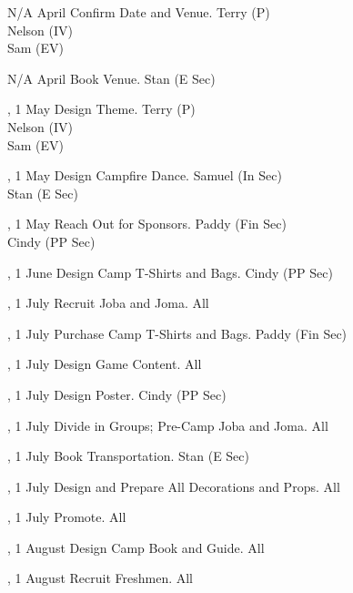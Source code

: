 \eTABLEhead
\bTABLEbody

\bTR\bTD N/A
\eTD{} April
\eTD\bTD Confirm Date and Venue.
\eTD\bTD Terry (P) \\ Nelson (IV) \\ Sam (EV)
\eTD\eTR

\bTR\bTD N/A
\eTD{} April
\eTD\bTD Book Venue.
\eTD\bTD Stan (E Sec)
\eTD\eTR

\bTR{}, 1
\eTD{} May
\eTD\bTD Design Theme.
\eTD\bTD Terry (P) \\ Nelson (IV) \\ Sam (EV)
\eTD\eTR

\bTR{}, 1
\eTD{} May
\eTD\bTD Design Campfire Dance.
\eTD\bTD Samuel (In Sec) \\ Stan (E Sec)
\eTD\eTR

\bTR{}, 1
\eTD{} May
\eTD\bTD Reach Out for Sponsors.
\eTD\bTD Paddy (Fin Sec) \\ Cindy (PP Sec)
\eTD\eTR

\bTR{}, 1
\eTD{} June
\eTD\bTD Design Camp T-Shirts and Bags.
\eTD\bTD Cindy (PP Sec)
\eTD\eTR

\bTR{}, 1
\eTD{} July
\eTD\bTD Recruit Joba and Joma.
\eTD\bTD All
\eTD\eTR

\bTR{}, 1
\eTD{} July
\eTD\bTD Purchase Camp T-Shirts and Bags.
\eTD\bTD Paddy (Fin Sec)
\eTD\eTR

\bTR{}, 1
\eTD{} July
\eTD\bTD Design Game Content.
\eTD\bTD All
\eTD\eTR

\bTR{}, 1
\eTD{} July
\eTD\bTD Design Poster.
\eTD\bTD Cindy (PP Sec)
\eTD\eTR

\bTR{}, 1
\eTD{} July
\eTD\bTD Divide in Groups; Pre-Camp Joba and Joma.
\eTD\bTD All
\eTD\eTR

\bTR{}, 1
\eTD{} July
\eTD\bTD Book Transportation.
\eTD\bTD Stan (E Sec)
\eTD\eTR

\bTR{}, 1
\eTD{} July
\eTD\bTD Design and Prepare All Decorations and Props.
\eTD\bTD All
\eTD\eTR

\bTR{}, 1
\eTD{} July
\eTD\bTD Promote.
\eTD\bTD All
\eTD\eTR

\bTR{}, 1
\eTD{} August
\eTD\bTD Design Camp Book and Guide.
\eTD\bTD All
\eTD\eTR

\bTR{}, 1
\eTD{} August
\eTD\bTD Recruit Freshmen.
\eTD\bTD All
\eTD\eTR

